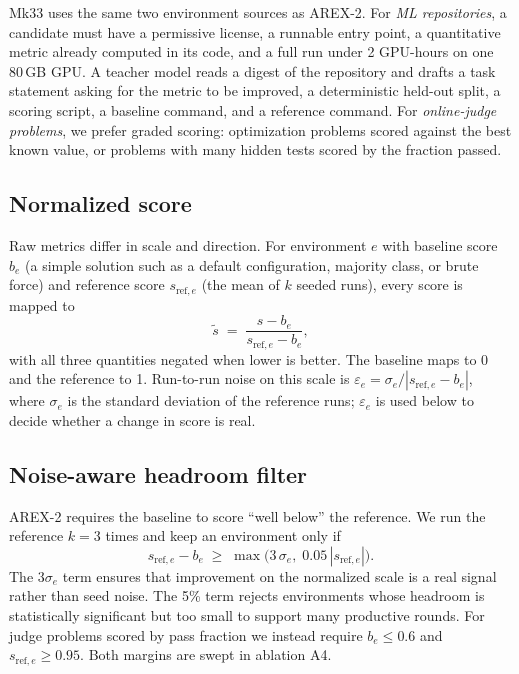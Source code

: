 \documentclass[11pt]{article}
\newcommand{\stilde}{\tilde{s}}
\begin{document}
Mk33 uses the same two environment sources as AREX-2. For \emph{ML repositories}, a candidate must have a permissive license, a runnable entry point, a quantitative metric already computed in its code, and a full run under 2 GPU-hours on one 80\,GB GPU. A teacher model reads a digest of the repository and drafts a task statement asking for the metric to be improved, a deterministic held-out split, a scoring script, a baseline command, and a reference command. For \emph{online-judge problems}, we prefer graded scoring: optimization problems scored against the best known value, or problems with many hidden tests scored by the fraction passed.

\subsection{Normalized score}
\label{sec:normalize}
Raw metrics differ in scale and direction. For environment $e$ with baseline score $b_e$ (a simple solution such as a default configuration, majority class, or brute force) and reference score $s_{\text{ref},e}$ (the mean of $k$ seeded runs), every score is mapped to
\begin{equation}
  \stilde \;=\; \frac{s - b_e}{s_{\text{ref},e} - b_e},
  \label{eq:norm}
\end{equation}
with all three quantities negated when lower is better. The baseline maps to 0 and the reference to 1. Run-to-run noise on this scale is $\varepsilon_e = \sigma_e / |s_{\text{ref},e} - b_e|$, where $\sigma_e$ is the standard deviation of the reference runs; $\varepsilon_e$ is used below to decide whether a change in score is real.

\subsection{Noise-aware headroom filter}
\label{sec:filter}
AREX-2 requires the baseline to score ``well below'' the reference. We run the reference $k=3$ times and keep an environment only if
\begin{equation}
  s_{\text{ref},e} - b_e \;\ge\; \max\!\big(3\,\sigma_e,\; 0.05\,|s_{\text{ref},e}|\big).
  \label{eq:headroom}
\end{equation}
The $3\sigma_e$ term ensures that improvement on the normalized scale is a real signal rather than seed noise. The 5\% term rejects environments whose headroom is statistically significant but too small to support many productive rounds. For judge problems scored by pass fraction we instead require $b_e \le 0.6$ and $s_{\text{ref},e} \ge 0.95$. Both margins are swept in ablation A4.
\end{document}
